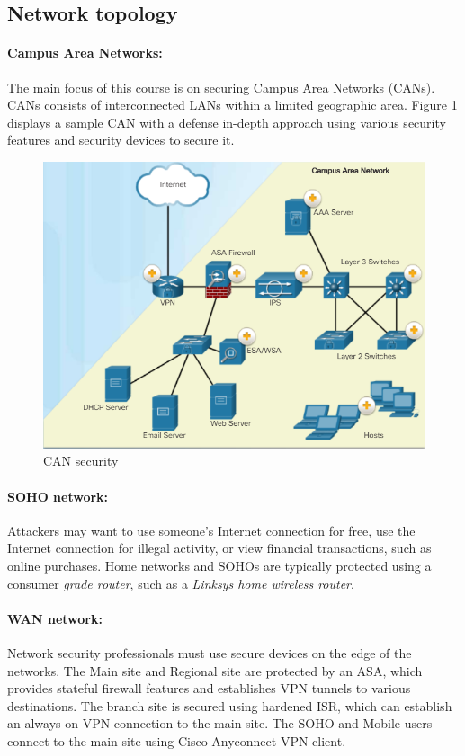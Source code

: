 \subsection{Network topology}

\paragraph{Campus Area Networks:} The main focus of this course is on securing Campus Area Networks (CANs). CANs consists of interconnected LANs within a limited geographic area. Figure \ref{CANsec} displays a sample CAN with a defense in-depth approach using various security features and security devices to secure it.

\begin{figure}[hbtp]
\caption{CAN security}\label{CANsec}
\centering
\includegraphics[scale=0.5]{pictures/CANsec.PNG}
\end{figure}

\paragraph{SOHO network:} Attackers may want to use someone's Internet connection for free, use the Internet connection for illegal activity, or view financial transactions, such as online purchases. Home networks and SOHOs are typically protected using a consumer \emph{grade router}, such as a \emph{Linksys home wireless router}. 

\paragraph{WAN network:} Network security professionals must use secure devices on the edge of the networks. The Main site and Regional site are protected by an ASA, which provides stateful firewall features and establishes VPN tunnels to various destinations. The branch site is secured using hardened ISR, which can establish an always-on VPN connection to the main site. The SOHO and Mobile users connect to the main site using Cisco Anyconnect VPN client. 

